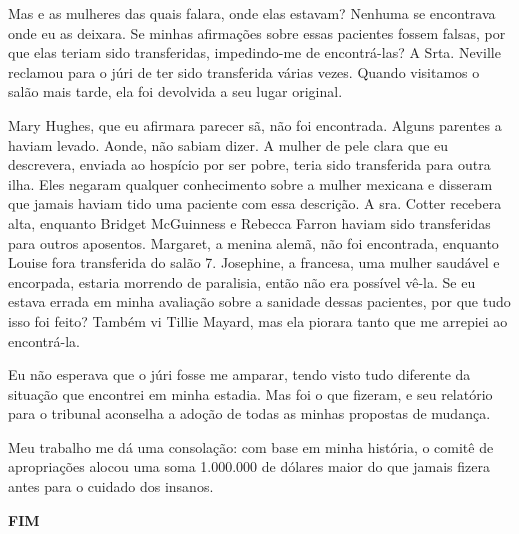 Mas e as mulheres das quais falara, onde elas estavam? Nenhuma se
encontrava onde eu as deixara. Se minhas afirmações sobre essas
pacientes fossem falsas, por que elas teriam sido transferidas,
impedindo-me de encontrá-las? A Srta. Neville reclamou para o júri de
ter sido transferida várias vezes. Quando visitamos o salão mais tarde,
ela foi devolvida a seu lugar original.

Mary Hughes, que eu afirmara parecer sã, não foi encontrada. Alguns
parentes a haviam levado. Aonde, não sabiam dizer. A mulher de pele
clara que eu descrevera, enviada ao hospício por ser pobre, teria sido
transferida para outra ilha. Eles negaram qualquer conhecimento sobre a
mulher mexicana e disseram que jamais haviam tido uma paciente com essa
descrição. A sra. Cotter recebera alta, enquanto Bridget McGuinness e
Rebecca Farron haviam sido transferidas para outros aposentos. Margaret,
a menina alemã, não foi encontrada, enquanto Louise fora transferida do
salão 7. Josephine, a francesa, uma mulher saudável e encorpada, estaria
morrendo de paralisia, então não era possível vê-la. Se eu estava errada
em minha avaliação sobre a sanidade dessas pacientes, por que tudo isso
foi feito? Também vi Tillie Mayard, mas ela piorara tanto que me
arrepiei ao encontrá-la.

Eu não esperava que o júri fosse me amparar, tendo visto tudo diferente
da situação que encontrei em minha estadia. Mas foi o que fizeram, e seu
relatório para o tribunal aconselha a adoção de todas as minhas
propostas de mudança.

Meu trabalho me dá uma consolação: com base em minha história, o comitê
de apropriações alocou uma soma 1.000.000 de dólares maior do que jamais
fizera antes para o cuidado dos insanos.

\textbf{FIM}
